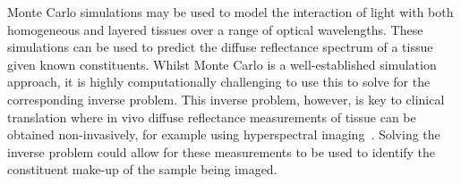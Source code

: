 

Monte Carlo simulations may be used to model
the interaction of light with
both homogeneous and layered tissues
over a range of optical wavelengths.
These simulations can be used to predict the diffuse reflectance spectrum of a tissue given known constituents. Whilst Monte Carlo is a well-established simulation approach, it is highly computationally challenging to use this to solve for the corresponding inverse problem. This inverse problem, however, is key to clinical translation where in vivo diffuse reflectance measurements of tissue can be obtained non-invasively, for example using hyperspectral imaging~\cite{Clancy2020}. Solving the inverse problem could allow for these measurements to be used to identify the constituent make-up of the sample being imaged. 

